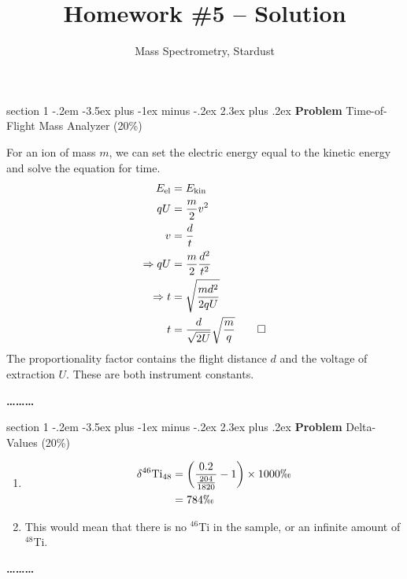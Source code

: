 \documentclass[letterpaper,12pt,twoside=false,DIV=11]{scrartcl}
\makeatletter
\newcommand{\topic}{\author}
\newenvironment{problem}{\@startsection
    {section}
    {1}
    {-.2em}
    {-3.5ex plus -1ex minus -.2ex}
    {2.3ex plus .2ex}
    {
        \pagebreak[3] %
        \noindent\sffamily\bfseries Problem
    }
}
{
    \begin{center}\large\bfseries\ldots\ldots\ldots\end{center}
}
\providecommand{\ex}[1]{\ensuremath{^{#1}}}
\makeatother
\begin{document}
\title{Homework \#5 -- Solution}
\topic{Mass Spectrometry, Stardust}
\date{}

\maketitle
\thispagestyle{fancy}

\begin{problem}{Time-of-Flight Mass Analyzer (20\%)}

For an ion of mass $m$, we can set the electric energy equal to the kinetic energy and solve the equation for time.
\begin{align}
    E_\mathrm{el} &= E_\mathrm{kin}\\
    qU &= \frac{m}{2}v^2\\
    v &= \frac{d}{t}\\
    \Rightarrow qU &= \frac{m}{2} \frac{d^2}{t^2}\\
    \Rightarrow t &= \sqrt{\frac{md^2}{2qU}}\\
    t &= \frac{d}{\sqrt{2U}} \sqrt{\frac{m}{q}} \qed
\end{align}
The proportionality factor contains the flight distance $d$ and the voltage of extraction $U$. These are both instrument constants.

\end{problem}

\begin{problem}{Delta-Values (20\%)}
\begin{enumerate}
    \item   \begin{align}
                \delta^{46}\mathrm{Ti}_{48} &= \left(\frac{0.2}{\frac{204}{1820}} - 1\right) \times 1000 \permil\\
                &= 784\permil
            \end{align}
    \item This would mean that there is no \ex{46}Ti in the sample, or an infinite amount of \ex{48}Ti.
\end{enumerate}
\end{problem}
\end{document}
